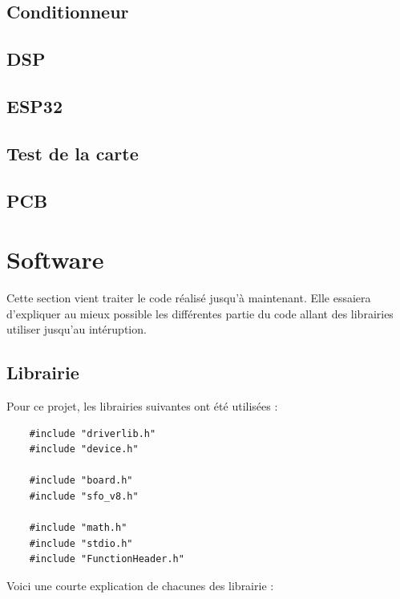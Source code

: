 \subsection{Conditionneur}

\subsection{DSP}

\subsection{ESP32}

\subsection{Test de la carte}

\subsection{PCB}

\section{Software}
Cette section vient traiter le code réalisé jusqu'à maintenant. Elle essaiera d'expliquer au mieux possible les différentes partie du code allant des librairies utiliser jusqu'au intéruption.

\subsection{Librairie}
Pour ce projet, les librairies suivantes ont été utilisées :

\begin{verbatim}
    #include "driverlib.h"
    #include "device.h"

    #include "board.h"
    #include "sfo_v8.h"

    #include "math.h"
    #include "stdio.h"
    #include "FunctionHeader.h"
\end{verbatim}

Voici une courte explication de chacunes des librairie :

